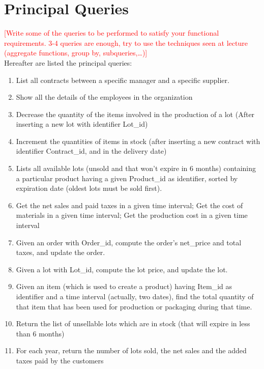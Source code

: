 \section{Principal Queries}
\textcolor{red}{[Write some of the queries to be performed to satisfy your functional requirements. 3-4 queries are enough, try to use the techniques seen at lecture (aggregate functions, group by, subqueries,…)]}\\
Hereafter are listed the principal queries:
\begin{enumerate}
    \item List all contracts between a specific manager and a specific supplier.
    \item Show all the details of the employees in the organization
    \item Decrease the quantity of the items involved in the production of a lot (After inserting a new lot with identifier Lot\_id)
    \item Increment the quantities of items in stock (after inserting a new contract with identifier Contract\_id, and in the delivery date)
    \item Lists all available lots (unsold and that won't expire in 6 months) containing a particular product having a given Product\_id as identifier, sorted by expiration date (oldest lots must be sold first).
    \item Get the net sales and paid taxes in a given time interval; Get the cost of materials in a given time interval; Get the production cost in a given time interval
    \item Given an order with Order\_id, compute the order's net\_price and total taxes, and update the order.
    \item Given a lot with Lot\_id, compute the lot price, and update the lot.
    \item Given an item (which is used to create a product) having Item\_id as identifier and a time interval (actually, two dates), find the total quantity of that item that has been used for production or packaging during that time.
    \item Return the list of unsellable lots which are in stock (that will expire in less than 6 months)
    \item For each year, return the number of lots sold, the net sales and the added taxes paid by the customers
\end{enumerate}



